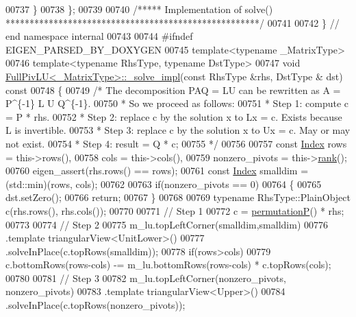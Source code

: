 \begin{DoxyCode}
00737   \}
00738 \};
00739 
00740 \textcolor{comment}{/***** Implementation of solve() *****************************************************/}
00741 
00742 \} \textcolor{comment}{// end namespace internal}
00743 
00744 \textcolor{preprocessor}{#ifndef EIGEN\_PARSED\_BY\_DOXYGEN}
00745 \textcolor{keyword}{template}<\textcolor{keyword}{typename} \_MatrixType>
00746 \textcolor{keyword}{template}<\textcolor{keyword}{typename} RhsType, \textcolor{keyword}{typename} DstType>
00747 \textcolor{keywordtype}{void} \hyperlink{group___l_u___module_class_eigen_1_1_full_piv_l_u}{FullPivLU<\_MatrixType>::\_solve\_impl}(\textcolor{keyword}{const} RhsType &rhs, DstType &
      dst)\textcolor{keyword}{ const}
00748 \textcolor{keyword}{}\{
00749   \textcolor{comment}{/* The decomposition PAQ = LU can be rewritten as A = P^\{-1\} L U Q^\{-1\}.}
00750 \textcolor{comment}{  * So we proceed as follows:}
00751 \textcolor{comment}{  * Step 1: compute c = P * rhs.}
00752 \textcolor{comment}{  * Step 2: replace c by the solution x to Lx = c. Exists because L is invertible.}
00753 \textcolor{comment}{  * Step 3: replace c by the solution x to Ux = c. May or may not exist.}
00754 \textcolor{comment}{  * Step 4: result = Q * c;}
00755 \textcolor{comment}{  */}
00756 
00757   \textcolor{keyword}{const} \hyperlink{namespace_eigen_a62e77e0933482dafde8fe197d9a2cfde}{Index} rows = this->rows(),
00758               cols = this->cols(),
00759               nonzero\_pivots = this->\hyperlink{group___l_u___module_a67a870aa69e699e058d04802ba0bdad9}{rank}();
00760   eigen\_assert(rhs.rows() == rows);
00761   \textcolor{keyword}{const} \hyperlink{namespace_eigen_a62e77e0933482dafde8fe197d9a2cfde}{Index} smalldim = (std::min)(rows, cols);
00762 
00763   \textcolor{keywordflow}{if}(nonzero\_pivots == 0)
00764   \{
00765     dst.setZero();
00766     \textcolor{keywordflow}{return};
00767   \}
00768 
00769   \textcolor{keyword}{typename} RhsType::PlainObject c(rhs.rows(), rhs.cols());
00770 
00771   \textcolor{comment}{// Step 1}
00772   c = \hyperlink{group___l_u___module_a09274c82240f6441af5e6c99e24e756d}{permutationP}() * rhs;
00773 
00774   \textcolor{comment}{// Step 2}
00775   m\_lu.topLeftCorner(smalldim,smalldim)
00776       .template triangularView<UnitLower>()
00777       .solveInPlace(c.topRows(smalldim));
00778   \textcolor{keywordflow}{if}(rows>cols)
00779     c.bottomRows(rows-cols) -= m\_lu.bottomRows(rows-cols) * c.topRows(cols);
00780 
00781   \textcolor{comment}{// Step 3}
00782   m\_lu.topLeftCorner(nonzero\_pivots, nonzero\_pivots)
00783       .template triangularView<Upper>()
00784       .solveInPlace(c.topRows(nonzero\_pivots));

\end{DoxyCode}

